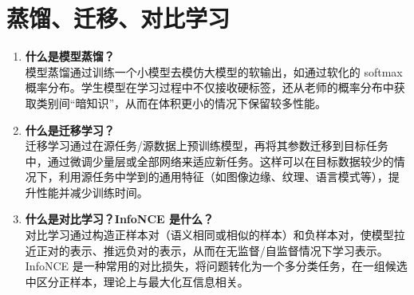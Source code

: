 \documentclass{article}
\begin{document}
\section{蒸馏、迁移、对比学习}
\begin{enumerate}
\item \textbf{什么是模型蒸馏？}\\
模型蒸馏通过训练一个小模型去模仿大模型的软输出，如通过软化的 softmax 概率分布。学生模型在学习过程中不仅接收硬标签，还从老师的概率分布中获取类别间“暗知识”，从而在体积更小的情况下保留较多性能。

\item \textbf{什么是迁移学习？}\\
迁移学习通过在源任务/源数据上预训练模型，再将其参数迁移到目标任务中，通过微调少量层或全部网络来适应新任务。这样可以在目标数据较少的情况下，利用源任务中学到的通用特征（如图像边缘、纹理、语言模式等），提升性能并减少训练时间。

\item \textbf{什么是对比学习？InfoNCE 是什么？}\\
对比学习通过构造正样本对（语义相同或相似的样本）和负样本对，使模型拉近正对的表示、推远负对的表示，从而在无监督/自监督情况下学习表示。InfoNCE 是一种常用的对比损失，将问题转化为一个多分类任务，在一组候选中区分正样本，理论上与最大化互信息相关。
\end{enumerate}
\end{document}
